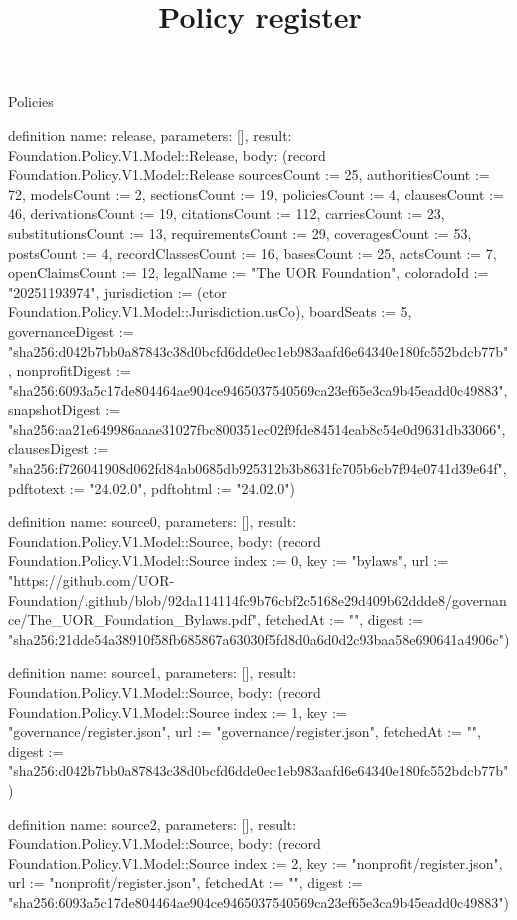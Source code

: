 \begin{lexlean}{Policies}
\title{Policy register}
\begin{semanticmodule}
definition{
  name: release,
  parameters: [],
  result: Foundation.Policy.V1.Model::Release,
  body: (record Foundation.Policy.V1.Model::Release {sourcesCount := 25, authoritiesCount := 72, modelsCount := 2, sectionsCount := 19, policiesCount := 4, clausesCount := 46, derivationsCount := 19, citationsCount := 112, carriesCount := 23, substitutionsCount := 13, requirementsCount := 29, coveragesCount := 53, postsCount := 4, recordClassesCount := 16, basesCount := 25, actsCount := 7, openClaimsCount := 12, legalName := "The UOR Foundation", coloradoId := "20251193974", jurisdiction := (ctor Foundation.Policy.V1.Model::Jurisdiction.usCo), boardSeats := 5, governanceDigest := "sha256:d042b7bb0a87843c38d0bcfd6dde0ec1eb983aafd6e64340e180fc552bdcb77b", nonprofitDigest := "sha256:6093a5c17de804464ae904ce9465037540569ca23ef65e3ca9b45eadd0c49883", snapshotDigest := "sha256:aa21e649986aaae31027fbc800351ec02f9fde84514eab8c54e0d9631db33066", clausesDigest := "sha256:f726041908d062fd84ab0685db925312b3b8631fc705b6cb7f94e0741d39e64f", pdftotext := "24.02.0", pdftohtml := "24.02.0"})
}

definition{
  name: source0,
  parameters: [],
  result: Foundation.Policy.V1.Model::Source,
  body: (record Foundation.Policy.V1.Model::Source {index := 0, key := "bylaws", url := "https://github.com/UOR-Foundation/.github/blob/92da114114fc9b76cbf2c5168e29d409b62ddde8/governance/The_UOR_Foundation_Bylaws.pdf", fetchedAt := "", digest := "sha256:21dde54a38910f58fb685867a63030f5fd8d0a6d0d2c93baa58e690641a4906c"})
}

definition{
  name: source1,
  parameters: [],
  result: Foundation.Policy.V1.Model::Source,
  body: (record Foundation.Policy.V1.Model::Source {index := 1, key := "governance/register.json", url := "governance/register.json", fetchedAt := "", digest := "sha256:d042b7bb0a87843c38d0bcfd6dde0ec1eb983aafd6e64340e180fc552bdcb77b"})
}

definition{
  name: source2,
  parameters: [],
  result: Foundation.Policy.V1.Model::Source,
  body: (record Foundation.Policy.V1.Model::Source {index := 2, key := "nonprofit/register.json", url := "nonprofit/register.json", fetchedAt := "", digest := "sha256:6093a5c17de804464ae904ce9465037540569ca23ef65e3ca9b45eadd0c49883"})
}


\end{semanticmodule}
\end{lexlean}
